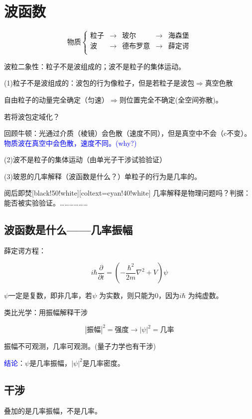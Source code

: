 \section{波函数}


$$
\text{物质}\left\{ \begin{matrix}
    \text{粒子}& \rightarrow& \text{玻尔}& \rightarrow& \text{海森堡}\\
    \text{波}& \rightarrow& \text{德布罗意}& \rightarrow& \text{薛定谔}\\
\end{matrix} \right. 
$$

波粒二象性：粒子不是波组成的；波不是粒子的集体运动。

(1)粒子不是波组成的：波包的行为像粒子，但是若粒子是波包$\Rightarrow$真空色散

自由粒子的动量完全确定（匀速）$\Rightarrow$则位置完全不确定(全空间弥散)。

若将波包定域化？

回顾牛顿：光通过介质（棱镜）会色散（速度不同），但是真空中不会（c不变）。\textcolor{blue}{物质波在真空中会色散，速度不同。(why?)}

(2)波不是粒子的集体运动（由单光子干涉试验验证）

(3)玻恩的几率解释（波函数是什么？）单粒子的行为是几率的。

\begin{ascolorbox5}[]{阅后即焚}[black!50!white][coltext=cyan!40!white]
    几率解释是物理问题吗？判据：能否被实验验证。………………
\end{ascolorbox5}

\subsection{波函数是什么——几率振幅}
薛定谔方程：

$$i\hbar\frac{\partial}{\partial t}=(-\frac{\hbar^2}{2m}\nabla^2+V)\psi
$$

$\psi$一定是复数，即非几率，若$\psi$ 为实数，则只能为0，因为$i\hbar$ 为纯虚数。

类比光学：用振幅解释干涉

$$\left|\text{振幅}\right|^2=\text{强度} \longrightarrow \left|\psi \right|^2= \text{几率}$$

振幅不可观测，几率可观测。(量子力学也有干涉)

\textcolor{blue}{结论}：$\psi$是几率振幅，$\left|\psi\right|^2$是几率密度。


\subsection{干涉}
叠加的是几率振幅，不是几率。

